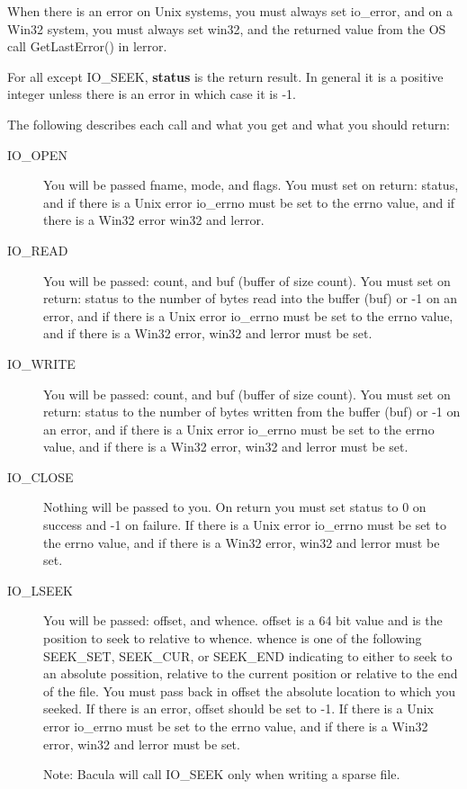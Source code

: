 When there is an error on Unix systems, you must always set io\_error, and
on a Win32 system, you must always set win32, and the returned value from
the OS call GetLastError() in lerror.

For all except IO\_SEEK, {\bf status} is the return result.  In general it is
a positive integer unless there is an error in which case it is -1.

The following describes each call and what you get and what you
should return:

\begin{description}
 \item [IO\_OPEN]
   You will be passed fname, mode, and flags.
   You must set on return: status, and if there is a Unix error
   io\_errno must be set to the errno value, and if there is a
   Win32 error win32 and lerror.

 \item [IO\_READ]
  You will be passed: count, and buf (buffer of size count).
  You must set on return: status to the number of bytes
  read into the buffer (buf) or -1 on an error,
  and if there is a Unix error
  io\_errno must be set to the errno value, and if there is a
  Win32 error, win32 and lerror must be set.

 \item [IO\_WRITE]
  You will be passed: count, and buf (buffer of size count).
  You must set on return: status to the number of bytes
  written from the buffer (buf) or -1 on an error,
  and if there is a Unix error
  io\_errno must be set to the errno value, and if there is a
  Win32 error, win32 and lerror must be set.

 \item [IO\_CLOSE]
  Nothing will be passed to you.  On return you must set
  status to 0 on success and -1 on failure.  If there is a Unix error
  io\_errno must be set to the errno value, and if there is a
  Win32 error, win32 and lerror must be set.

 \item [IO\_LSEEK]
  You will be passed: offset, and whence. offset is a 64 bit value
  and is the position to seek to relative to whence.  whence is one
  of the following SEEK\_SET, SEEK\_CUR, or SEEK\_END indicating to
  either to seek to an absolute possition, relative to the current
  position or relative to the end of the file.
  You must pass back in offset the absolute location to which you
  seeked. If there is an error, offset should be set to -1.
  If there is a Unix error
  io\_errno must be set to the errno value, and if there is a
  Win32 error, win32 and lerror must be set.

  Note: Bacula will call IO\_SEEK only when writing a sparse file.

\end{description}


